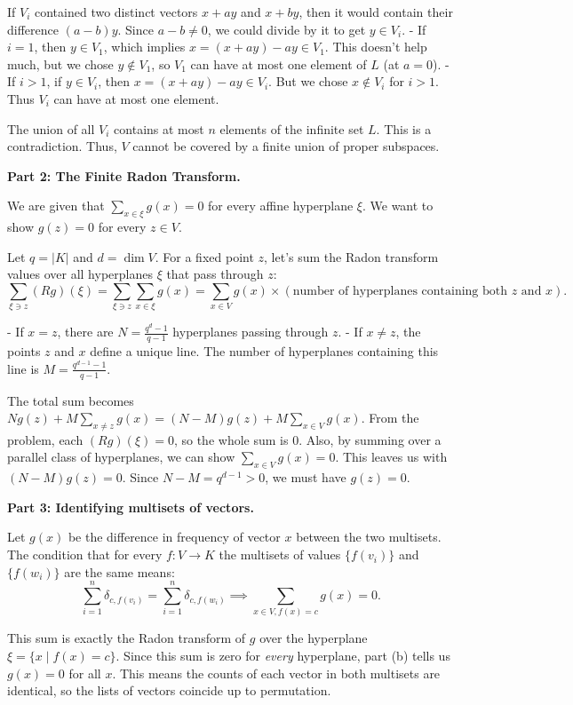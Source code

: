 \begin{solution}
\bigskip

If $V_i$ contained two distinct vectors $x+ay$ and $x+by$, then it would contain their difference $(a-b)y$. Since $a-b \neq 0$, we could divide by it to get $y \in V_i$. 
- If $i=1$, then $y \in V_1$, which implies $x = (x+ay) - ay \in V_1$. This doesn't help much, but we chose $y \notin V_1$, so $V_1$ can have at most one element of $L$ (at $a=0$).
- If $i > 1$, if $y \in V_i$, then $x = (x+ay) - ay \in V_i$. But we chose $x \notin V_i$ for $i > 1$. Thus $V_i$ can have at most one element.

\bigskip

The union of all $V_i$ contains at most $n$ elements of the infinite set $L$. This is a contradiction. Thus, $V$ cannot be covered by a finite union of proper subspaces.

\bigskip

\textbf{Part 2: The Finite Radon Transform.}

We are given that $\sum_{x \in \xi} g(x) = 0$ for every affine hyperplane $\xi$. We want to show $g(z) = 0$ for every $z \in V$.

\bigskip

Let $q = |K|$ and $d = \dim V$. For a fixed point $z$, let's sum the Radon transform values over all hyperplanes $\xi$ that pass through $z$:
\[ \sum_{\xi \ni z} (Rg)(\xi) = \sum_{\xi \ni z} \sum_{x \in \xi} g(x) = \sum_{x \in V} g(x) \times (\text{number of hyperplanes containing both } z \text{ and } x). \]

\bigskip

- If $x = z$, there are $N = \frac{q^d - 1}{q - 1}$ hyperplanes passing through $z$.
- If $x \neq z$, the points $z$ and $x$ define a unique line. The number of hyperplanes containing this line is $M = \frac{q^{d-1} - 1}{q - 1}$.

\bigskip

The total sum becomes $N g(z) + M \sum_{x \neq z} g(x) = (N-M)g(z) + M \sum_{x \in V} g(x)$. From the problem, each $(Rg)(\xi) = 0$, so the whole sum is 0. Also, by summing over a parallel class of hyperplanes, we can show $\sum_{x \in V} g(x) = 0$. This leaves us with $(N-M)g(z) = 0$. Since $N-M = q^{d-1} > 0$, we must have $g(z) = 0$.

\bigskip

\textbf{Part 3: Identifying multisets of vectors.}

Let $g(x)$ be the difference in frequency of vector $x$ between the two multisets. The condition that for every $f: V \to K$ the multisets of values $\{f(v_i)\}$ and $\{f(w_i)\}$ are the same means:
\[ \sum_{i=1}^n \delta_{c, f(v_i)} = \sum_{i=1}^n \delta_{c, f(w_i)} \implies \sum_{x \in V, f(x)=c} g(x) = 0. \]

\bigskip

This sum is exactly the Radon transform of $g$ over the hyperplane $\xi = \{x \mid f(x) = c\}$. Since this sum is zero for \textit{every} hyperplane, part (b) tells us $g(x) = 0$ for all $x$. This means the counts of each vector in both multisets are identical, so the lists of vectors coincide up to permutation.
\end{solution}

